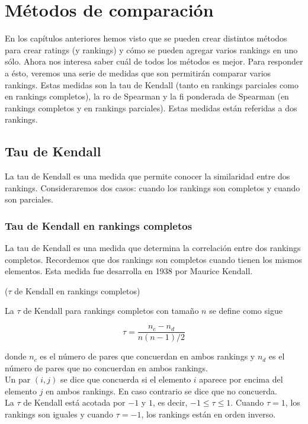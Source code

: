 \chapter{Métodos de comparación}

En los capítulos anteriores hemos visto que se pueden crear distintos métodos para crear ratings (y rankings) y cómo se pueden agregar varios rankings en uno sólo. Ahora nos interesa saber cuál de todos los métodos es mejor. Para responder a ésto, veremos una serie de medidas que son permitirán comparar varios rankings. Estas medidas son la tau de Kendall (tanto en rankings parciales como en rankings completos), la ro de Spearman y la fi ponderada de Spearman (en rankings completos y en rankings parciales). Estas medidas están referidas a dos rankings.

\section{Tau de Kendall}

La tau de Kendall es una medida que permite conocer la similaridad entre dos rankings. Consideraremos dos casos: cuando los rankings son completos y cuando son parciales.

\subsection{Tau de Kendall en rankings completos}

La tau de Kendall es una medida que determina la correlación entre dos rankings completos. Recordemos que dos rankings son completos cuando tienen los mismos elementos. Esta medida fue desarrolla en 1938 por Maurice Kendall.\\

\begin{defi}($\tau$ de Kendall en rankings completos) 

La $\tau$ de Kendall para rankings completos con tamaño $n$ se define como sigue

\begin{equation}
\tau = \dfrac{n_c - n_d}{n(n-1)/2}
\end{equation}

donde $n_c$ es el número de pares que concuerdan en ambos rankings y $n_d$ es el número de pares que no concuerdan en ambos rankings.\\

Un par $(i,j)$ se dice que concuerda si el elemento $i$ aparece por encima del elemento $j$ en ambos rankings. En caso contrario se dice que no concuerda.\\


La $\tau$ de Kendall está acotada por $-1$ y $1$, es decir, $-1 \leq \tau \leq 1$. Cuando $\tau = 1$, los rankings son iguales y cuando $\tau = -1$, los rankings están en orden inverso.  
\end{defi}

